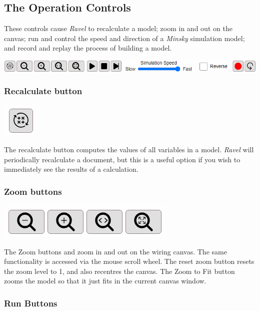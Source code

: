 \subsection{The Operation Controls}

These controls cause \emph{Ravel} to recalculate a model; zoom in
and out on the canvas; run and control the speed and direction of
a \emph{Minsky} simulation model; and record and replay the process
of building a model.

\includegraphics[width=15cm]{images/OperationsControls}

\subsubsection{Recalculate button}\label{Recalculate}

\includegraphics{images/Recalc}

The recalculate button computes the values of all variables in a model.
\emph{Ravel} will periodically recalculate a document, but this is
a useful option if you wish to immediately see the results of a calculation.

\subsubsection{Zoom buttons}

\label{ZoomButtons}

\includegraphics{images/ZoomControls}

The Zoom buttons  and 
zoom in and out on the wiring canvas. The same functionality is
accessed via the mouse scroll wheel. The reset zoom button
 resets the zoom level to 1, and also
recentres the canvas. The Zoom to Fit button
 zooms the model so that it just fits in the
current canvas window.

\subsubsection{Run Buttons}

